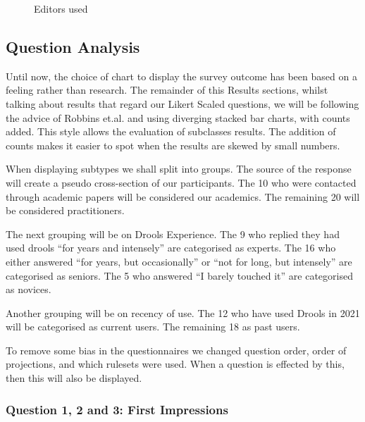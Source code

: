 \begin{figure}[h]
    \centering
    \caption{Editors used}
    \label{fig:editorUsage}
\end{figure}


\subsection{Question Analysis}
Until now, the choice of chart to display the survey outcome has been based on a feeling rather than research. 
The remainder of this Results sections, whilst talking about results that regard our Likert Scaled questions, we will be following the advice of Robbins et.al.\cite{robbins2011plotting} and using diverging stacked bar charts, with counts added.
This style allows the evaluation of subclasses results.
The addition of counts makes it easier to spot when the results are skewed by small numbers.

When displaying subtypes we shall split into groups.
The source of the response will create a pseudo cross-section of our participants.
The 10 who were contacted through academic papers will be considered our academics.
The remaining 20 will be considered practitioners.

The next grouping will be on Drools Experience.
The 9 who replied they had used drools ``for years and intensely'' are categorised as experts.
The 16 who either answered ``for years, but occasionally'' or ``not for long, but intensely'' are categorised as seniors.
The 5 who answered ``I barely touched it'' are categorised as novices.

Another grouping will be on recency of use.
The 12 who have used Drools in 2021 will be categorised as current users.
The remaining 18 as past users.

To remove some bias in the questionnaires we changed question order, order of projections, and which rulesets were used.
When a question is effected by this, then this will also be displayed.

\subsubsection{Question 1, 2 and 3: First Impressions}

